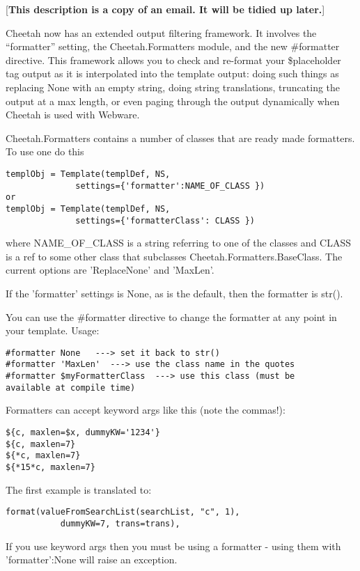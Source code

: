 [{\bf This description is a copy of an email.  It will be tidied up later.}]

Cheetah now has an extended output filtering framework. It involves the
``formatter'' setting, the Cheetah.Formatters module, and the new \#formatter
directive.  This framework allows you to check and re-format your \$placeholder
tag output as it is interpolated into the template output: doing such things as
replacing None with an empty string, doing string translations, truncating the
output at a max length, or even paging through the output dynamically when
Cheetah is used with Webware.

Cheetah.Formatters contains a number of classes that are ready made formatters.
To use one do this
\begin{verbatim}
templObj = Template(templDef, NS, 
              settings={'formatter':NAME_OF_CLASS })
or 
templObj = Template(templDef, NS, 
              settings={'formatterClass': CLASS })

\end{verbatim}

where NAME_OF_CLASS is a string referring to one of the classes and CLASS is a
ref to some other class that subclasses Cheetah.Formatters.BaseClass. The
current options are 'ReplaceNone' and 'MaxLen'.

If the 'formatter' settings is None, as is the default, then the formatter is
str().

You can use the \#formatter directive to change the 
formatter at any point in your template.  Usage:

\begin{verbatim}
#formatter None   ---> set it back to str()
#formatter 'MaxLen'  ---> use the class name in the quotes
#formatter $myFormatterClass  ---> use this class (must be 
available at compile time)
\end{verbatim}

Formatters can accept keyword args like this (note the commas!):
\begin{verbatim}
${c, maxlen=$x, dummyKW='1234'}
${c, maxlen=7}
${*c, maxlen=7}
${*15*c, maxlen=7}
\end{verbatim}

The first example is translated to: 
\begin{verbatim}
format(valueFromSearchList(searchList, "c", 1), 
           dummyKW=7, trans=trans),
\end{verbatim}

If you use keyword args then you must be using a formatter - using them with
'formatter':None will raise an exception.

